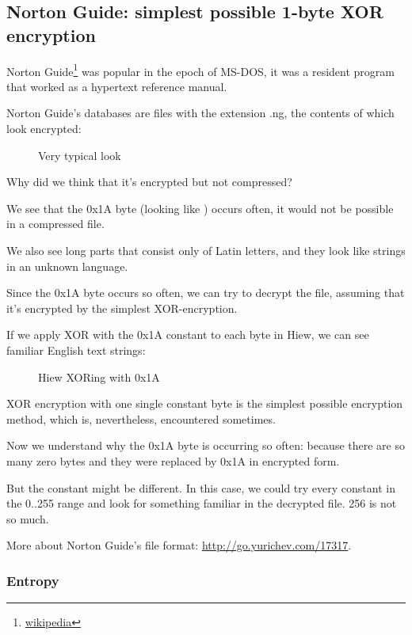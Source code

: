 \clearpage
\subsection{Norton Guide: simplest possible 1-byte XOR encryption}
\label{norton_guide}

Norton Guide\footnote{\href{http://go.yurichev.com/17116}{wikipedia}} was popular in the epoch of MS-DOS, it was a resident program that worked as a hypertext reference manual.

Norton Guide's databases are files with the extension .ng, the contents of which look encrypted:

\begin{figure}[H]
\centering
{}
\caption{Very typical look}
\end{figure}

Why did we think that it's encrypted but not compressed?

We see that the 0x1A byte (looking like \q{$\rightarrow$}) occurs often, it would not be possible in a compressed file.

We also see long parts that consist only of Latin letters, and they look like strings in an unknown
language.

\clearpage
Since the 0x1A byte occurs so often, we can try to decrypt the file, assuming that it's encrypted
by the simplest XOR-encryption.

If we apply XOR with the 0x1A constant to each byte in Hiew, we can see familiar English text strings:

\begin{figure}[H]
\centering
{}
\caption{Hiew XORing with 0x1A}
\end{figure}

XOR encryption with one single constant byte is the simplest possible encryption method, which is, nevertheless,
encountered sometimes.

Now we understand why the 0x1A byte is occurring so often: because there are so many zero bytes and they
were replaced by 0x1A in encrypted form.

But the constant might be different.
In this case, we could try every constant in the 0..255 range and look for something familiar in the decrypted
file. 256 is not so much.

More about Norton Guide's file format: \url{http://go.yurichev.com/17317}.

\subsubsection{Entropy}

